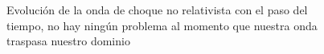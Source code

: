 \documentclass[12pt,a4paper]{book}
\begin{document}
\begin{figure}[H]
\centering
{}
\caption{Evolución de la onda de choque no relativista con el paso del tiempo, no hay ningún problema al momento que nuestra onda traspasa nuestro dominio} \label{fig:Lax-prueba2}
\end{figure}
\end{document}

